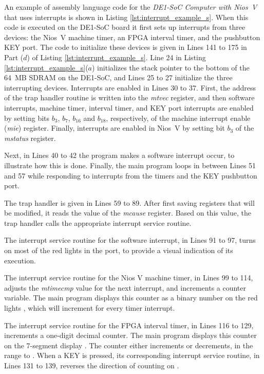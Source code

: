 \documentclass[11pt, twoside, pdftex]{article}
\newcommand{\DEBoard}{DE1-SoC}
\newcommand{\systemNameFull}{DE1-SoC Computer with Nios~V}
\begin{document}
An example of assembly language code for the {\it \systemNameFull} that uses interrupts is
shown in Listing \ref{lst:interrupt_example_s}. When this code is executed on the
{\DEBoard} board it first sets up interrupts from three devices: the Nios~V machine timer, 
an FPGA interval timer, and the pushbutton KEY port. The code to initialize these devices
is given in Lines 141 to 175 in Part ($d$) of Listing \ref{lst:interrupt_example_s}. 
Line 24 in Listing \ref{lst:interrupt_example_s}($a$) initializes the stack pointer to
the bottom of the 64~MB SDRAM on the {\DEBoard}, and Lines 25 to 27 initialize the
three interrupting devices. Interrupts are enabled in Lines 30 to 37. First, the address of
the trap handler routine is written into the {\it mtvec} register, and then software
interrupts, machine timer, interval timer, and KEY port interrupts are
enabled by setting bits $b_3$, $b_7$, $b_{16}$ and $b_{18}$, respectively, of the 
machine interrupt enable ({\it mie}) register. 
Finally, interrupts are enabled in Nios~V by setting bit $b_3$ of the {\it mstatus} register.

Next, in Lines 40 to 42 the program makes a software 
interrupt occur, to illustrate how this is done. Finally, the main program loops in
between Lines 51 and 57 while responding to interrupts from the timers and the 
KEY pushbutton port. 

The trap handler is given in Lines 59 to 89. After first saving registers that will be
modified, it reads the value of the {\it mcause} register. Based on this value, the trap
handler calls the appropriate interrupt service routine. 

The interrupt service routine for the software interrupt, in Lines 91 to 97, 
turns on most of the red lights in the  port, to provide a visual indication of 
its execution. 

The interrupt service routine for the Nios V machine timer, in Lines 99 to 114,
adjusts the {\it mtimecmp} value for the next interrupt, and 
increments a counter variable. The main program displays this counter as a binary number 
on the red lights , which will increment for every timer interrupt.

The interrupt service routine for the FPGA interval timer, in Lines 116 to 129,
increments a one-digit decimal counter. The main program displays this counter on the 
7-segment display . The counter either increments or decrements,
in the range  to .  When a KEY is pressed, its corresponding 
interrupt service routine, in Lines 131 to 139, reverses the direction of counting on . 
\end{document}
